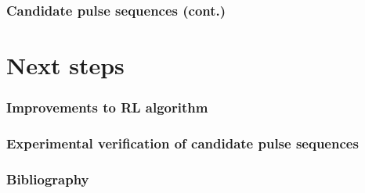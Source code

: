 \documentclass{beamer}
\begin{document}
\begin{frame}
\frametitle{Candidate pulse sequences (cont.)}
\end{frame}

\section{Next steps}

\begin{frame}
\frametitle{Improvements to RL algorithm}
\end{frame}

\begin{frame}
\frametitle{Experimental verification of candidate pulse sequences}
\end{frame}

\begin{frame}[allowframebreaks]
\frametitle{Bibliography}

\printbibliography

\end{frame}
\end{document}
